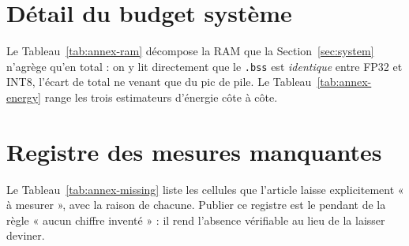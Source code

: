 \documentclass[11pt,a4paper]{article}
\begin{document}
\section{Détail du budget système}
\label{app:budget}

Le Tableau~\ref{tab:annex-ram} décompose la RAM que la Section~\ref{sec:system}
n'agrège qu'en total : on y lit directement que le \texttt{.bss} est \emph{identique}
entre FP32 et INT8, l'écart de total ne venant que du pic de pile. Le
Tableau~\ref{tab:annex-energy} range les trois estimateurs d'énergie côte à côte.




\section{Registre des mesures manquantes}
\label{app:missing}

Le Tableau~\ref{tab:annex-missing} liste les cellules que l'article laisse
explicitement « à mesurer », avec la raison de chacune. Publier ce registre est le
pendant de la règle « aucun chiffre inventé » : il rend l'absence vérifiable au lieu
de la laisser deviner.



\printglossary[type=\acronymtype,title=Acronymes]
\label{sec:acronyms}
\end{document}

